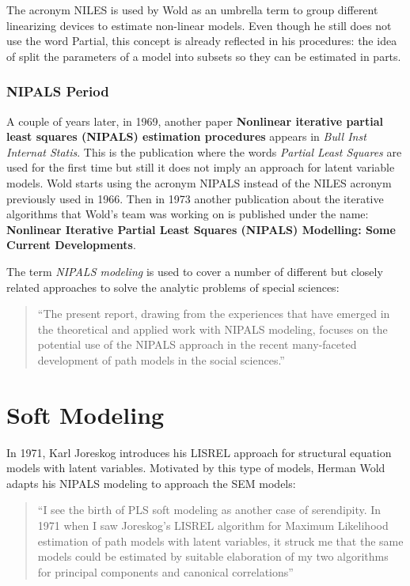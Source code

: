 \documentclass[12pt]{book}\usepackage{graphicx, color}
\begin{document}
The acronym NILES is used by Wold as an umbrella term to group different linearizing devices to estimate non-linear models. Even though he still does not use the word Partial, this concept is already reflected in his procedures: the idea of split the parameters of a model into subsets so they can be estimated in parts.



\subsubsection*{NIPALS Period}
A couple of years later, in 1969, another paper \textbf{Nonlinear iterative partial least squares (NIPALS) estimation procedures} appears in \textit{Bull Inst Internat Statis}. This is the publication where the words \textit{Partial Least Squares} are used for the first time but still it does not imply an approach for latent variable models. Wold starts using the acronym NIPALS instead of the NILES acronym previously used in 1966. Then in 1973 another publication about the iterative algorithms that Wold's team was working on is published under the name: \textbf{Nonlinear Iterative Partial Least Squares (NIPALS) Modelling: Some Current Developments}. 

The term \textit{NIPALS modeling} is used to cover a number of different but closely related approaches to solve the analytic problems of special sciences: 

\begin{quotation}\noindent
``The present report, drawing from the experiences that have emerged in the theoretical and applied work with NIPALS modeling, focuses on the potential use of the NIPALS approach in the recent many-faceted development of path models in the social sciences.''
\end{quotation}




\section{Soft Modeling}
In 1971, Karl Joreskog introduces his LISREL approach for structural equation models with latent variables. Motivated by this type of models, Herman Wold adapts his NIPALS modeling to approach the SEM models: 

\begin{quotation}\noindent
``I see the birth of PLS soft modeling as another case of serendipity. In 1971 when I saw Joreskog's LISREL algorithm for Maximum Likelihood estimation of path models with latent variables, it struck me that the same models could be estimated by suitable elaboration of my two algorithms for principal components and canonical correlations''
\end{quotation}
\end{document}

